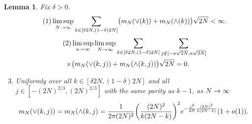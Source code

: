\documentclass[10pt]{amsart}
\newtheorem{lemm}[theo]{Lemma}\newtheorem{prop}[theo]{Proposition}\newtheorem{coro}[theo]{Corollary}\newtheorem{conj}[theo]{Conjecture}
\theoremstyle{definition}\newtheorem{defi}[theo]{Definition}\newtheorem{rema}[theo]{Remark}\newtheorem{exam}[theo]{Example}\newtheorem{exem}[theo]{Example}\newtheorem{nota}[theo]{Notation}
\newcommand{\Wedge}{\wedge}\newcommand{\Vee}{\vee}
\theoremstyle{plain}
\let\originalleft\left
\let\originalright\right
\renewcommand{\left}{\mathopen{}\mathclose\bgroup\originalleft}
\renewcommand{\right}{\aftergroup\egroup\originalright}
\renewcommand*{\to}{\mathchoice{\longrightarrow}{\rightarrow}{\rightarrow}{\rightarrow}}
\begin{document}
\begin{lemm}\label{lemma:EstimatesmN}
Fix $\delta > 0$.
\begin{equation}\label{lemm4.6.1}
\tag{$1$}
\limsup_{N\to\infty} \sum_{k\in [\delta 2N, (1 - \delta) 2N]} \bigl(m_N(\Vee(k)) + m_N(\Wedge(k))\bigr) \sqrt{2N} < \infty.
\end{equation}
\begin{multline}\label{lemm4.6.2}
\tag{$2$}
\limsup_{a\to\infty}\limsup_{N\to\infty} \sum_{k\in [\delta 2N, (1 - \delta) 2N]} \sum_{j\notin [-a\sqrt{2N}, a\sqrt{2N}]}\\
\times\bigl(m_N(\Vee(k,j)) + m_N(\Wedge(k,j))\bigr)\sqrt{2N} = 0.
\end{multline}
\begin{enumerate}
\setcounter{enumi}{2}
\item\label{lemm4.6.3} Uniformly over all $k\in [\delta 2N, (1 - \delta) 2N]$ and all $j \in [-(2N)^{2/3},(2N)^{2/3}]$ with the same parity as $k-1$, as $N\to\infty$
\begin{align*}
m_{N}(\Vee(k,j)) = m_{N}(\Wedge(k,j) = \frac1{2\pi (2N)^2} \left(\frac{(2N)^2}{k (2N-k)}\right)^{2} e^{-\frac{j^2}{2N} \frac{(2N)^2}{k(2N-k)}} (1+o(1)).
\end{align*}
\end{enumerate}
\end{lemm}
\end{document}
